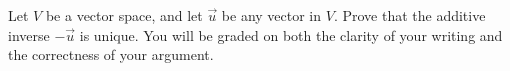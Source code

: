 \documentclass[12pt]{exam}
\begin{document}
\begin{questions}
\question[20]
Let $V$ be a vector space, and let $\vec{u}$ be any vector in $V$.  Prove that the additive inverse $-\vec{u}$ is unique.  You will be graded on both the clarity of your writing and the correctness of your argument.


\end{questions}
\end{document}
